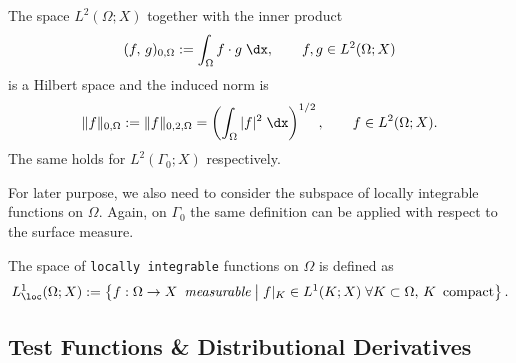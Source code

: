 \begin{proposition}
	The space $L^2(\Omega;X)$ together with the inner product
	\begin{equation*}
		(f,\,g)_{0,\Omega}:= \int_\Omega f\cdot g\;\dx,\qquad f,g\in L^2(\Omega;X)
	\end{equation*}
	is a Hilbert space and the induced norm is
	\begin{equation*}
		\|f\|_{0,\Omega}:=\|f\|_{0,2,\Omega} = \left(\int_\Omega |f|^2\;\dx \right)^{1/2},\qquad f\in L^2(\Omega;X).
	\end{equation*}
	The same holds for $L^2(\Gamma_0;X)$ respectively.
\end{proposition}

For later purpose, we also need to consider the subspace of locally integrable functions on $\Omega$. Again, on $\Gamma_0$ the same definition can be applied with respect to the surface measure.

\begin{definition}
	The space of {\tt locally integrable} functions on $\Omega$ is defined as
	\begin{equation*}
		L_\loc^1(\Omega;X): = \left\{f:\Omega\to X\text{\em\enspace measurable}\;\middle|\;f|_K\in L^1(K;X)\;\forall K\subset\Omega,\,K\textit{\em\enspace compact}\right\}.
	\end{equation*}
\end{definition}

\subsection{Test Functions \& Distributional Derivatives}

